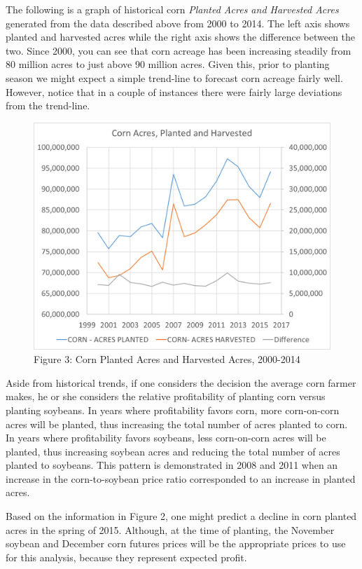 \documentclass[]{book}
\theoremstyle{definition}
\theoremstyle{definition}
\theoremstyle{remark}
\begin{document}
The following is a graph of historical corn \emph{Planted Acres and
Harvested Acres} generated from the data described above from 2000 to
2014. The left axis shows planted and harvested acres while the right
axis shows the difference between the two. Since 2000, you can see that
corn acreage has been increasing steadily from 80 million acres to just
above 90 million acres. Given this, prior to planting season we might
expect a simple trend-line to forecast corn acreage fairly well.
However, notice that in a couple of instances there were fairly large
deviations from the trend-line.

\begin{figure}[htbp]
\centering
\includegraphics{Excel-files/ForecastingProduction-HistoricalAcreage_files/image001.png}
\caption{Figure 3: Corn Planted Acres and Harvested Acres, 2000-2014}
\end{figure}

Aside from historical trends, if one considers the decision the average
corn farmer makes, he or she considers the relative profitability of
planting corn versus planting soybeans. In years where profitability
favors corn, more corn-on-corn acres will be planted, thus increasing
the total number of acres planted to corn. In years where profitability
favors soybeans, less corn-on-corn acres will be planted, thus
increasing soybean acres and reducing the total number of acres planted
to soybeans. This pattern is demonstrated in 2008 and 2011 when an
increase in the corn-to-soybean price ratio corresponded to an increase
in planted acres.

Based on the information in Figure 2, one might predict a decline in
corn planted acres in the spring of 2015. Although, at the time of
planting, the November soybean and December corn futures prices will be
the appropriate prices to use for this analysis, because they represent
expected profit.
\end{document}
